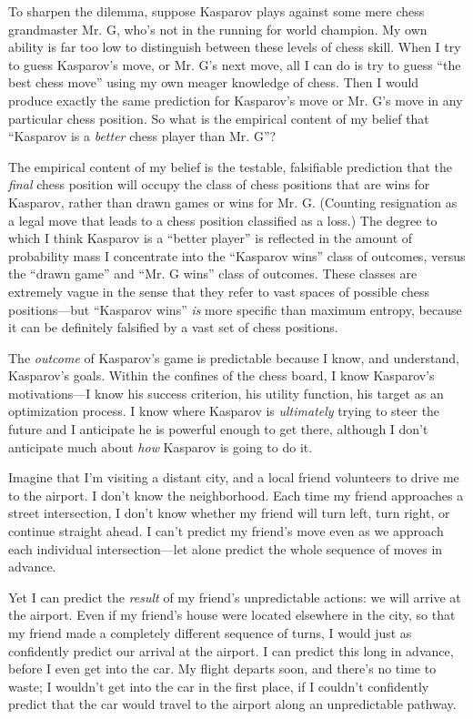 {
 To sharpen the dilemma, suppose Kasparov plays against some mere
chess grandmaster Mr. G, who's not in the running for
world champion. My own ability is far too low to distinguish between
these levels of chess skill. When I try to guess
Kasparov's move, or Mr. G's next move,
all I can do is try to guess ``the best chess
move'' using my own meager knowledge of chess. Then I
would produce exactly the same prediction for
Kasparov's move or Mr. G's move in any
particular chess position. So what is the empirical content of my
belief that ``Kasparov is a \textit{better} chess
player than Mr. G''?}

{
 The empirical content of my belief is the testable, falsifiable
prediction that the \textit{final} chess position will occupy the class
of chess positions that are wins for Kasparov, rather than drawn games
or wins for Mr. G. (Counting resignation as a legal move that leads to
a chess position classified as a loss.) The degree to which I think
Kasparov is a ``better player'' is
reflected in the amount of probability mass I concentrate into the
``Kasparov wins'' class of outcomes,
versus the ``drawn game'' and
``Mr. G wins'' class of outcomes.
These classes are extremely vague in the sense that they refer to vast
spaces of possible chess positions---but ``Kasparov
wins'' \textit{is} more specific than maximum
entropy, because it can be definitely falsified by a vast set of chess
positions.}

{
 The \textit{outcome} of Kasparov's game is
predictable because I know, and understand, Kasparov's
goals. Within the confines of the chess board, I know
Kasparov's motivations---I know his success criterion,
his utility function, his target as an optimization process. I know
where Kasparov is \textit{ultimately} trying to steer the future and I
anticipate he is powerful enough to get there, although I
don't anticipate much about \textit{how} Kasparov is
going to do it.}

{
 Imagine that I'm visiting a distant city, and a
local friend volunteers to drive me to the airport. I
don't know the neighborhood. Each time my friend
approaches a street intersection, I don't know whether
my friend will turn left, turn right, or continue straight ahead. I
can't predict my friend's move even as
we approach each individual intersection---let alone predict the whole
sequence of moves in advance.}

{
 Yet I can predict the \textit{result} of my
friend's unpredictable actions: we will arrive at the
airport. Even if my friend's house were located
elsewhere in the city, so that my friend made a completely different
sequence of turns, I would just as confidently predict our arrival at
the airport. I can predict this long in advance, before I even get into
the car. My flight departs soon, and there's no time to
waste; I wouldn't get into the car in the first place,
if I couldn't confidently predict that the car would
travel to the airport along an unpredictable pathway.}

